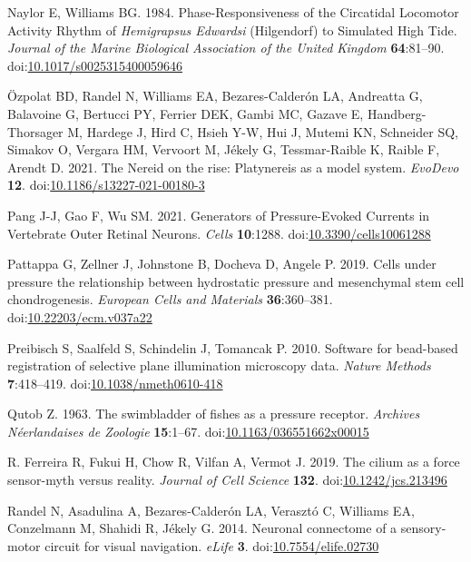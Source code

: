 \documentclass[
  11pt,
]{article}
\newlength{\cslhangindent}
\newenvironment{CSLReferences}[2] %
 {\begin{list}{}{%
  \setlength{\itemindent}{0pt}
  \setlength{\leftmargin}{0pt}
  \setlength{\parsep}{0pt}
  \ifodd #1
   \setlength{\leftmargin}{\cslhangindent}
   \setlength{\itemindent}{-1\cslhangindent}
  \fi
  \setlength{\itemsep}{#2\baselineskip}}}
 {\end{list}}
\begin{document}
\begin{CSLReferences}{1}{0}
Naylor E, Williams BG. 1984. Phase-Responsiveness of the Circatidal
Locomotor Activity Rhythm of {\emph{Hemigrapsus Edwardsi}} (Hilgendorf)
to Simulated High Tide. \emph{Journal of the Marine Biological
Association of the United Kingdom} \textbf{64}:81--90.
doi:\href{https://doi.org/10.1017/s0025315400059646}{10.1017/s0025315400059646}

Özpolat BD, Randel N, Williams EA, Bezares-Calderón LA, Andreatta G,
Balavoine G, Bertucci PY, Ferrier DEK, Gambi MC, Gazave E,
Handberg-Thorsager M, Hardege J, Hird C, Hsieh Y-W, Hui J, Mutemi KN,
Schneider SQ, Simakov O, Vergara HM, Vervoort M, Jékely G,
Tessmar-Raible K, Raible F, Arendt D. 2021. The Nereid on the rise:
Platynereis as a model system. \emph{EvoDevo} \textbf{12}.
doi:\href{https://doi.org/10.1186/s13227-021-00180-3}{10.1186/s13227-021-00180-3}

Pang J-J, Gao F, Wu SM. 2021. Generators of Pressure-Evoked Currents in
Vertebrate Outer Retinal Neurons. \emph{Cells} \textbf{10}:1288.
doi:\href{https://doi.org/10.3390/cells10061288}{10.3390/cells10061288}

Pattappa G, Zellner J, Johnstone B, Docheva D, Angele P. 2019. Cells
under pressure {\textendash} the relationship between hydrostatic
pressure and mesenchymal stem cell chondrogenesis. \emph{European Cells
and Materials} \textbf{36}:360--381.
doi:\href{https://doi.org/10.22203/ecm.v037a22}{10.22203/ecm.v037a22}

Preibisch S, Saalfeld S, Schindelin J, Tomancak P. 2010. Software for
bead-based registration of selective plane illumination microscopy data.
\emph{Nature Methods} \textbf{7}:418--419.
doi:\href{https://doi.org/10.1038/nmeth0610-418}{10.1038/nmeth0610-418}

Qutob Z. 1963. The swimbladder of fishes as a pressure receptor.
\emph{Archives Néerlandaises de Zoologie} \textbf{15}:1--67.
doi:\href{https://doi.org/10.1163/036551662x00015}{10.1163/036551662x00015}

R. Ferreira R, Fukui H, Chow R, Vilfan A, Vermot J. 2019. The cilium as
a force sensor{-}myth versus reality. \emph{Journal of Cell Science}
\textbf{132}.
doi:\href{https://doi.org/10.1242/jcs.213496}{10.1242/jcs.213496}

Randel N, Asadulina A, Bezares-Calderón LA, Verasztó C, Williams EA,
Conzelmann M, Shahidi R, Jékely G. 2014. Neuronal connectome of a
sensory-motor circuit for visual navigation. \emph{eLife} \textbf{3}.
doi:\href{https://doi.org/10.7554/elife.02730}{10.7554/elife.02730}


\end{CSLReferences}
\end{document}
